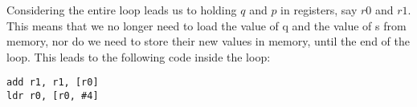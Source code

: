 Considering the entire loop leads us to holding $q$ and $p$ in registers, say $r0$ and $r1$. This means that we no longer need to load the value of q and the value of s from memory, nor do we need to store their new values in memory, until the end of the loop. This leads to the following code inside the loop:

\begin{lstlisting}
add r1, r1, [r0]
ldr r0, [r0, #4]
\end{lstlisting}
